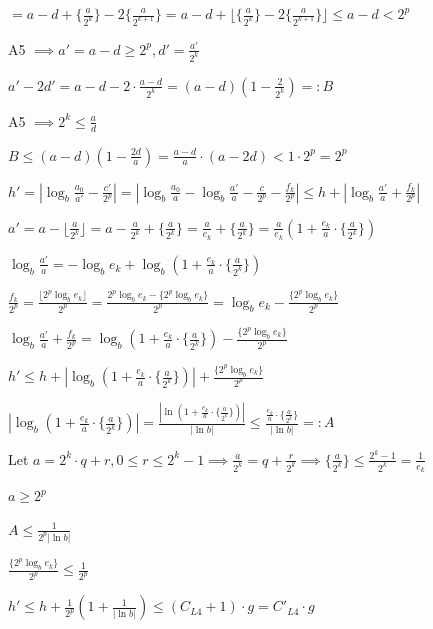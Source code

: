 \documentclass{article}
\begin{document}
\( = a - d + \{\frac{a}{2^{k}}\} - 2\{\frac{a}{2^{k+1}}\} = a - d + \lfloor\{\frac{a}{2^{k}}\} - 2\{\frac{a}{2^{k+1}}\}\rfloor \leq a - d < 2^{p} \)

A5 \( \implies a' = a - d \geq 2^{p}, d' = \frac{a'}{2^{k}} \)

\( a' - 2d'=a-d-2\cdot\frac{a-d}{2^{k}} = (a-d)(1 - \frac{2}{2^{k}}) =: B \)

A5 \( \implies 2^{k} \leq \frac{a}{d} \)

\( B \leq (a-d)(1-\frac{2d}{a}) = \frac{a-d}{a}\cdot(a-2d) < 1 \cdot 2^{p} = 2^{p} \)

\( h' = |\log_{b}\frac{a_{0}}{a'}-\frac{c'}{2^{p}}| = |\log_{b}\frac{a_{0}}{a}-\log_{b}\frac{a'}{a}-\frac{c}{2^{p}} - \frac{f_{k}}{2^{p}}| \leq h + |\log_{b}\frac{a'}{a} + \frac{f_{k}}{2^{p}} | \)

\( a'=a-\lfloor\frac{a}{2^{k}}\rfloor = a - \frac{a}{2^{k}} + \{ \frac{a}{2^{k}} \} = \frac{a}{e_{k}} + \{ \frac{a}{2^{k}} \} = \frac{a}{e_{k}}(1 + \frac{e_{k}}{a}\cdot \{ \frac{a}{2^{k}} \}) \)

\( \log_{b}\frac{a'}{a} = -\log_b{e_{k}} + \log_b{(1 + \frac{e_{k}}{a}\cdot \{ \frac{a}{2^{k}} \})} \)

\( \frac{f_{k}}{2^{p}} = \frac{\lfloor2^{p}\log_b{e_{k}}\rfloor}{2^{p}} = \frac{2^{p}\log_b{e_{k}} - \{2^{p}\log_b{e_{k}}\}}{2^{p}} = \log_b{e_{k}} - \frac{\{2^{p}\log_b{e_{k}}\}}{2^{p}} \)

\( \log_{b}\frac{a'}{a} + \frac{f_{k}}{2^{p}} = \log_b{(1 + \frac{e_{k}}{a}\cdot \{ \frac{a}{2^{k}} \})} - \frac{\{2^{p}\log_b{e_{k}}\}}{2^{p}} \)

\( h' \leq h + |\log_b{(1 + \frac{e_{k}}{a}\cdot \{ \frac{a}{2^{k}} \})}| + \frac{\{2^{p}\log_b{e_{k}}\}}{2^{p}} \)

\( |\log_b{(1 + \frac{e_{k}}{a}\cdot \{ \frac{a}{2^{k}} \})}| = \frac{|\ln{(1 + \frac{e_{k}}{a}\cdot \{ \frac{a}{2^{k}} \})}|}{|\ln{b}|} \leq \frac{\frac{e_{k}}{a}\cdot \{ \frac{a}{2^{k}} \}}{|\ln{b}|} =: A \)

Let \( a = 2^{k}\cdot q + r, 0 \leq r \leq 2^{k} - 1 \implies \frac{a}{2^{k}} = q + \frac{r}{2^{k}} \implies \{ \frac{a}{2^{k}} \} \leq \frac{2^{k}-1}{2^{k}} = \frac{1}{e_{k}} \)

\( a \geq 2^{p} \)

\( A \leq \frac{1}{2^{p} |\ln b| } \)

\( \frac{\{2^{p}\log_b{e_{k}}\}}{2^{p}} \leq \frac{1}{2^{p}} \)

\( h' \leq h + \frac{1}{2^{p}} (1 + \frac{1}{|\ln b|}) \leq (C_{L4} + 1) \cdot g = C'_{L4} \cdot g \)
\end{document}
